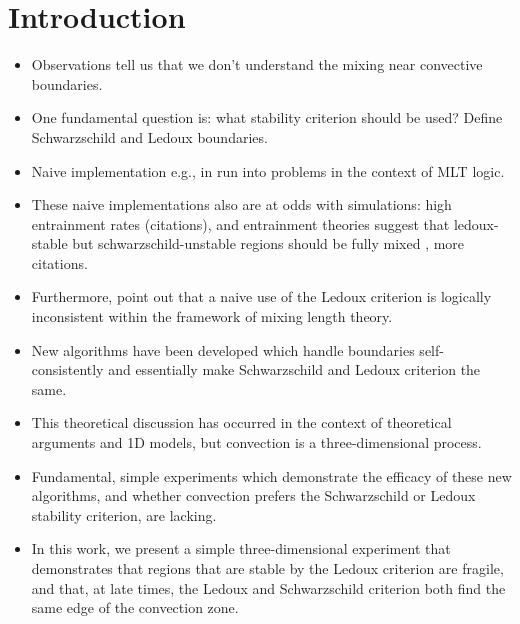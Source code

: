 
\section{Introduction}
\label{sec:introduction}

\begin{itemize}
\item Observations tell us that we don't understand the mixing near convective boundaries.
\item One fundamental question is: what stability criterion should be used? Define Schwarzschild and Ledoux boundaries.
\item Naive implementation e.g., in \citet{mesa2} run into problems in the context of MLT logic.
\item These naive implementations also are at odds with simulations: high entrainment rates (citations), and entrainment theories suggest that ledoux-stable but schwarzschild-unstable regions should be fully mixed \citep{fuentes_cumming_2020}, more citations.
\item Furthermore, \citet{gabriel_etal_2014} point out that a naive use of the Ledoux criterion is logically inconsistent within the framework of mixing length theory.
\item New algorithms \citep{mesa4, mesa5} have been developed which handle boundaries self-consistently and essentially make Schwarzschild and Ledoux criterion the same.
\item This theoretical discussion has occurred in the context of theoretical arguments and 1D models, but convection is a three-dimensional process.
\item Fundamental, simple experiments which demonstrate the efficacy of these new algorithms, and whether convection prefers the Schwarzschild or Ledoux stability criterion, are lacking.
\item In this work, we present a simple three-dimensional experiment that demonstrates that regions that are stable by the Ledoux criterion are fragile, and that, at late times, the Ledoux and Schwarzschild criterion both find the same edge of the convection zone.
\end{itemize}


